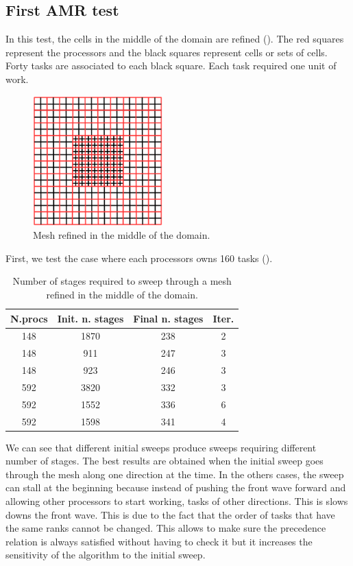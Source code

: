 \documentclass[letterpaper]{article}
\renewcommand{\(}{\left(}
\renewcommand{\)}{\right)}
\renewcommand{\[}{\left[}
\renewcommand{\]}{\right]}
\begin{document}
\subsection{First AMR test}
In this test, the cells in the middle of the domain are refined ().
The red squares represent the processors and the black squares represent cells
or sets of cells. Forty tasks are associated to each black square. Each task
required one unit of work.
\begin{figure}[H]
  \centering
  \includegraphics[width=5cm]{mesh}
  \caption{Mesh refined in the middle of the domain.}
  \label{mesh_1}
\end{figure}
First, we test the case where each processors owns 160 tasks ().
\begin{table}[H]
  \begin{center}
    \begin{tabular}{|c|c|c|c|}
      \hline
      N.procs & Init. n. stages & Final n. stages & Iter. \\
      \hline
      148 & 1870 & 238 & 2 \\
      148 &  911 & 247 & 3 \\
      148 &  923 & 246 & 3 \\
      592 & 3820 & 332 & 3 \\
      592 & 1552 & 336 & 6 \\
      592 & 1598 & 341 & 4 \\
      \hline
    \end{tabular}
    \caption{Number of stages required to sweep through a mesh refined
    in the middle of the domain.}
    \label{amr_1}
  \end{center}
\end{table}
We can see that different initial sweeps produce sweeps requiring different
number of stages. The best results are obtained when the initial sweep goes through the mesh
along one direction at the time. In the others cases, the sweep can stall at the beginning 
because instead of pushing the front wave forward and allowing other processors
to start working, tasks of other directions. This is slows 
downs the front wave. This is due to the fact that the order of tasks that have
the same ranks cannot be changed. This allows to make sure the precedence
relation is always satisfied without having to check it but it increases the
sensitivity of the algorithm to the initial sweep.
\end{document}
